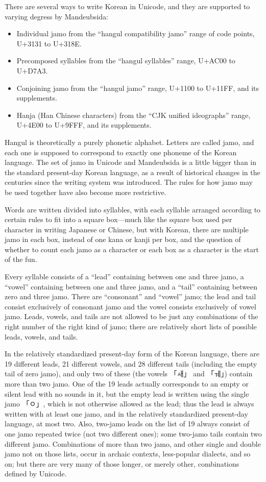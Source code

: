 \documentclass[14pt]{extarticle}
\begin{document}
There are several ways to write Korean in Unicode, and they are
supported to varying degress by Mandeubsida:
\begin{itemize}
  \item Individual jamo from the ``hangul compatibility jamo'' range
    of code points, U+3131 to U+318E.
  \item Precomposed syllables from the ``hangul syllables'' range,
    U+AC00 to U+D7A3.
  \item Conjoining jamo from the ``hangul jamo'' range, U+1100 to U+11FF, and
    its supplements.
  \item Hanja (Han Chinese characters) from the ``CJK unified ideographs''
    range, U+4E00 to U+9FFF, and its supplements.
\end{itemize}

Hangul is theoretically a purely phonetic alphabet.  Letters are called
jamo, and each one is supposed to correspond to exactly one phoneme of the
Korean language.  The set of jamo in Unicode and Mandeubsida is a little
bigger than in the standard present-day Korean language, as a result of
historical changes in the centuries since the writing system was introduced. 
The rules for how jamo may be used together have also become more
restrictive.

Words are written divided into syllables, with each syllable arranged
according to certain rules to fit into a square box---much like the square
box used per character in writing Japanese or Chinese, but with Korean,
there are multiple jamo in each box, instead of one kana or kanji per box,
and the question of whether to count each jamo as a character or each box as
a character is the start of the fun.

Every syllable consists of a ``lead'' containing between one and three jamo,
a ``vowel'' containing between one and three jamo, and a ``tail'' containing
between zero and three jamo.  There are ``consonant'' and ``vowel'' jamo;
the lead and tail consist exclusively of consonant jamo and the vowel
consists exclusively of vowel jamo.  Leads, vowels, and tails are not
allowed to be just any combinations of the right number of the right kind of
jamo; there are relatively short lists of possible leads, vowels, and tails. 

In the relatively standardized present-day form of the Korean language,
there are 19 different leads, 21 different vowels, and 28 different tails
(including the empty tail of zero jamo), and only two of these (the vowels
{\dodum 「ㅙ」} and {\dodum 「ㅞ」}) contain more than two jamo.  One of the
19 leads actually corresponds to an empty or silent lead with no sounds in
it, but the empty lead is written using the single jamo {\dodum 「ㅇ」},
which is not otherwise allowed as the lead; thus
the lead is always written with at least one jamo, and in the relatively
standardized present-day language, at most two.  Also, two-jamo leads on the
list of 19 always consist of one jamo repeated twice (not two different
ones); some two-jamo tails contain two different jamo.  Combinations of more
than two jamo, and other single and double jamo not on those lists, occur in
archaic contexts, less-popular dialects, and so on; but there are very many
of those longer, or merely other, combinations defined by Unicode.
\end{document}
